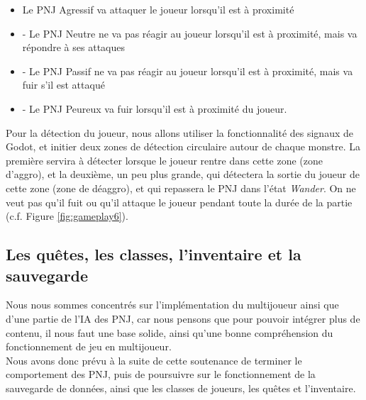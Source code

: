 \begin{itemize}

    \item Le PNJ Agressif va attaquer le joueur lorsqu'il est à proximité
          \\

    \item - Le PNJ Neutre ne va pas réagir au joueur lorsqu'il est à proximité, mais va répondre à ses attaques
          \\

    \item - Le PNJ Passif ne va pas réagir au joueur lorsqu'il est à proximité, mais va fuir s'il est attaqué
          \\

    \item - Le PNJ Peureux va fuir lorsqu'il est à proximité du joueur.
          \\

\end{itemize}

Pour la détection du joueur, nous allons utiliser la fonctionnalité des signaux de Godot, et initier deux zones de détection circulaire autour de chaque monstre.
La première servira à détecter lorsque le joueur rentre dans cette zone (zone d'aggro), et la deuxième, un peu plus grande, qui détectera la sortie du joueur de cette zone (zone de déaggro), et qui repassera le PNJ dans l'état \textit{Wander}.
On ne veut pas qu'il fuit ou qu'il attaque le joueur pendant toute la durée de la partie (c.f. Figure \ref*{fig:gameplay6}).

\subsection{Les quêtes, les classes, l'inventaire et la sauvegarde}

Nous nous sommes concentrés sur l'implémentation du multijoueur ainsi que d'une partie de l'IA des PNJ, car nous pensons que pour pouvoir intégrer plus de contenu, il nous faut une base solide, ainsi qu'une bonne compréhension du fonctionnement de jeu en multijoueur.
\\

Nous avons donc prévu à la suite de cette soutenance de terminer le comportement des PNJ, puis de poursuivre sur le fonctionnement de la sauvegarde de données, ainsi que les classes de joueurs, les quêtes et l'inventaire.

